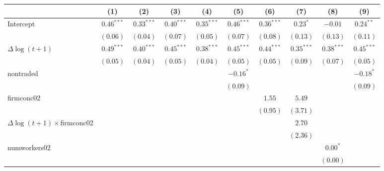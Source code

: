 
\begin{tabular}{l c c c c c c c c c }
\hline
 & (1) & (2) & (3) & (4) & (5) & (6) & (7) & (8) & (9) \\
\hline
Intercept          & $0.46^{***}$ & $0.33^{***}$ & $0.40^{***}$ & $0.35^{***}$ & $0.46^{***}$ & $0.36^{***}$ & $0.23^{*}$   & $-0.01$      & $0.24^{**}$  \\
                     & $(0.06)$     & $(0.04)$     & $(0.07)$     & $(0.05)$     & $(0.07)$     & $(0.08)$     & $(0.13)$     & $(0.13)$     & $(0.11)$     \\
$\Delta \log(t+1)$              & $0.49^{***}$ & $0.40^{***}$ & $0.45^{***}$ & $0.38^{***}$ & $0.45^{***}$ & $0.44^{***}$ & $0.35^{***}$ & $0.38^{***}$ & $0.45^{***}$ \\
                     & $(0.05)$     & $(0.04)$     & $(0.05)$     & $(0.04)$     & $(0.05)$     & $(0.05)$     & $(0.09)$     & $(0.07)$     & $(0.05)$     \\
nontraded            &              &              &              &              & $-0.16^{*}$  &              &              &              & $-0.18^{*}$  \\
                     &              &              &              &              & $(0.09)$     &              &              &              & $(0.09)$     \\
firmconc02           &              &              &              &              &              & $1.55$       & $5.49$       &              &              \\
                     &              &              &              &              &              & $(0.95)$     & $(3.71)$     &              &              \\
$\Delta \log(t+1) \times$firmconc02   &              &              &              &              &              &              & $2.70$       &              &              \\
                     &              &              &              &              &              &              & $(2.36)$     &              &              \\
numworkers02         &              &              &              &              &              &              &              & $0.00^{*}$   &              \\
                     &              &              &              &              &              &              &              & $(0.00)$     &              \\

\end{tabular}
